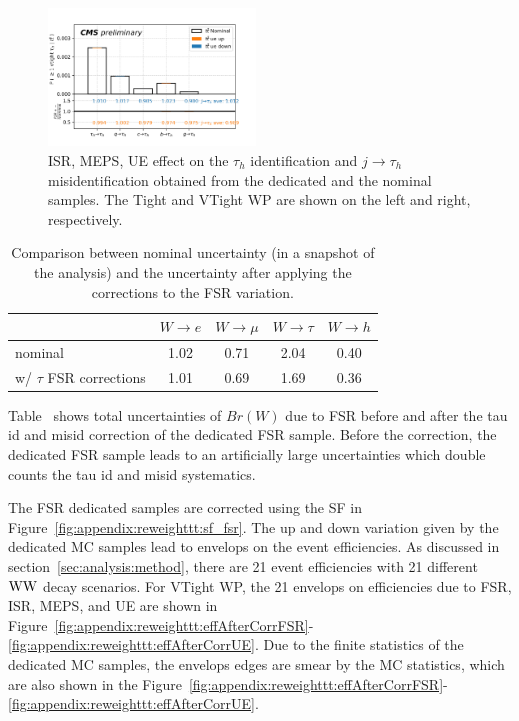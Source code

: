 \begin{figure}
    \includegraphics[width=0.49\textwidth]{chapters/Analysis/sectionSystematics/figures/ttTheoretical/2020_MCRatio_ue_tauGenFlavor_tauVTight.png}
    \caption{ISR, MEPS, UE effect on the $\tau_h$ identification and $j \to \tau_h$ misidentification obtained from the dedicated and the nominal \ttbar samples.
    The Tight and VTight WP are shown on the left and right, respectively.
    }
    \label{fig:appendix:reweighttt:sf_isr_MEPS_UE}
\end{figure}




\begin{table}[h]
    \centering
    \caption{Comparison between nominal uncertainty (in a snapshot of
        the analysis) and the uncertainty after applying the corrections
        to the FSR variation.}
        
    \begin{tabular}{l|cccc}
                                  & $W\rightarrow e$ & $W\rightarrow \mu$ & $W\rightarrow \tau$ & $W\rightarrow h$ \\
        \hline
        nominal                   & 1.02             & 0.71               & 2.04                & 0.40             \\
        w/ $\tau$ FSR corrections & 1.01             & 0.69               & 1.69                & 0.36             \\
    \end{tabular}
    \label{fig:fsr_correction}
\end{table}


Table~\label{fig:fsr_correction} shows total uncertainties of $Br(W)$ due 
to FSR before and after the tau id and misid correction of the dedicated FSR sample.
Before the correction, the dedicated FSR sample leads to an artificially large
uncertainties which double counts the tau id and misid systematics.




The FSR dedicated \ttbar samples are corrected using the SF in Figure~\ref{fig:appendix:reweighttt:sf_fsr}.
The up and down variation given by the dedicated MC samples lead to envelops on the \ttbar event efficiencies.
As discussed in section~\ref{sec:analysis:method}, there are 21 \ttbar event efficiencies with 21 different
$\mathrm{WW}$ decay scenarios. For VTight WP, the 21 envelops on efficiencies due to FSR, ISR, MEPS, and UE are shown in 
Figure~\ref{fig:appendix:reweighttt:effAfterCorrFSR}-\ref{fig:appendix:reweighttt:effAfterCorrUE}. 
Due to the finite statistics of the dedicated MC samples, the envelops edges are smear by the MC statistics, 
which are also shown in the Figure~\ref{fig:appendix:reweighttt:effAfterCorrFSR}-\ref{fig:appendix:reweighttt:effAfterCorrUE}.


